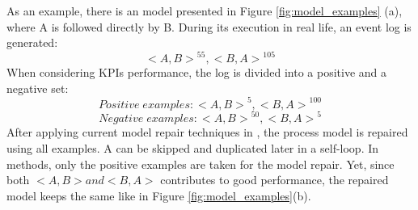
As an example, there is an model presented in Figure \ref{fig:model_examples} (a), where A is followed directly by B. During its execution in real life, an event log is generated: 
\[{ <A, B> }^{55}  , {<B, A>}^{105} \] 
When considering KPIs performance, the  log is divided into a positive and a negative set: 
\[ Positive \;  examples: { <A, B> }^{5}  , {<B, A>}^{100} \] 
\[ Negative \; examples: { <A, B> }^{50}  , {<B, A>}^{5} \]  
After applying current model repair techniques in \cite{fahland2015model}, the process model is repaired using all examples. A can be skipped and duplicated later in a self-loop. In \cite{dees2017enhancing} methods, only the positive examples are taken for the model repair. Yet, since both $<A,B> and <B,A>$ contributes to good performance,  the repaired model keeps the same like in Figure \ref{fig:model_examples}(b).

